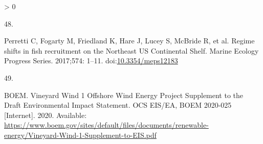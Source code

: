 \documentclass[
  10pt,
]{article}
\newlength{\cslhangindent}
\newlength{\csllabelwidth}
\newenvironment{CSLReferences}[2] %
 {%
  \setlength{\parindent}{0pt}
  \ifodd #1 \everypar{\setlength{\hangindent}{\cslhangindent}}\ignorespaces\fi
  \ifnum #2 > 0
  \setlength{\parskip}{#2\baselineskip}
  \fi
 }%
 {}
\newcommand{\CSLLeftMargin}[1]{\parbox[t]{\csllabelwidth}{#1}}
\newcommand{\CSLRightInline}[1]{\parbox[t]{\linewidth - \csllabelwidth}{#1}\break}
\begin{document}
\begin{CSLReferences}{0}{0}
\leavevmode\hypertarget{ref-perretti_regime_2017}{}%
\CSLLeftMargin{48. }
\CSLRightInline{Perretti C, Fogarty M, Friedland K, Hare J, Lucey S,
McBride R, et al. Regime shifts in fish recruitment on the {Northeast}
{US} {Continental} {Shelf}. Marine Ecology Progress Series. 2017;574:
1--11. doi:\href{https://doi.org/10.3354/meps12183}{10.3354/meps12183}}

\leavevmode\hypertarget{ref-boem_vineyard_2020}{}%
\CSLLeftMargin{49. }
\CSLRightInline{BOEM. Vineyard {Wind} 1 {Offshore} {Wind} {Energy}
{Project} {Supplement} to the {Draft} {Environmental} {Impact}
{Statement}. {OCS} {EIS}/{EA}, {BOEM} 2020-025 {[}Internet{]}. 2020.
Available:
\url{https://www.boem.gov/sites/default/files/documents/renewable-energy/Vineyard-Wind-1-Supplement-to-EIS.pdf}}

\end{CSLReferences}
\end{document}
